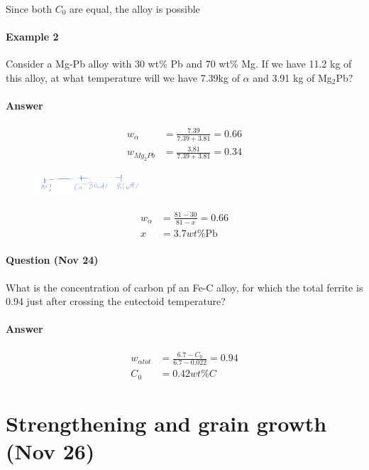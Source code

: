 \documentclass{article}
\begin{document}
Since both $C_0$ are equal, the alloy is possible

\paragraph{Example 2} Consider a Mg-Pb alloy with 30 wt\% Pb and 70 wt\% Mg. If we have 11.2 kg of this alloy, at what temperature will we have 7.39kg of $\alpha$ and 3.91 kg of Mg$_2$Pb?

\paragraph{Answer} \begin{align*}
    w_\alpha &= \frac{7.39}{7.39+3.81} = 0.66\\
    w_{Mg_2Pb} &= \frac{3.81}{7.39+3.81} = 0.34
\end{align*}

\begin{figure}[h!]
	\centering
	\includegraphics[width=0.36\textwidth]{assets/300f211e.png}
\end{figure}    

\begin{align*}
    w_\alpha &= \frac{81-30}{81-x} = 0.66\\
    x&= 3.7wt\%\text{Pb}
\end{align*}

\paragraph{Question (Nov 24)} What is the concentration of carbon pf an Fe-C alloy, for which the total ferrite is 0.94 just after crossing the eutectoid temperature?

\paragraph{Answer} \begin{align*}
    w_{\alpha tot} &= \frac{6.7-C_0}{6.7-0.022} = 0.94\\
    C_0 &= 0.42 wt\% C
\end{align*}

\section{Strengthening and grain growth (Nov 26)}
\end{document}
